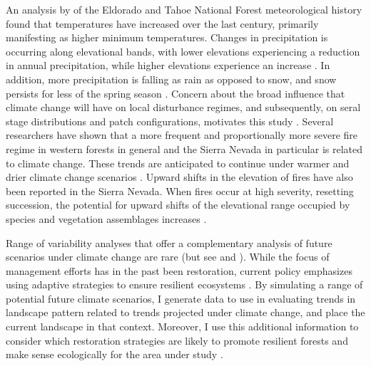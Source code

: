 An analysis by \citep{Mallek2014} of the Eldorado and Tahoe National Forest meteorological history found that temperatures have increased over the last century, primarily manifesting as higher minimum temperatures. Changes in precipitation is occurring along elevational bands, with lower elevations experiencing a reduction in annual precipitation, while higher elevations experience an increase \citep{Mallek2014}. In addition, more precipitation is falling as rain as opposed to snow, and snow persists for less of the spring season \citep{Mallek2014}. Concern about the broad influence that climate change will have on local disturbance regimes, and subsequently, on seral stage distributions and patch configurations, motivates this study \citep{Fule2008,North2012}. Several researchers have shown that a more frequent and proportionally more severe fire regime in western forests in general and the Sierra Nevada in particular \citep{McKenzie2004,Westerling2011,Miller2012} is related to climate change. These trends are anticipated to continue under warmer and drier climate change scenarios \citep{Dale2001,Cook2004,Westerling2006, Westerling2008}. Upward shifts in the elevation of fires have also been reported in the Sierra Nevada\citep{Schwartz2015}. When fires occur at high severity, resetting succession, the potential for upward shifts of the elevational range occupied by species and vegetation assemblages increases \citep{Schwartz2015}. 

Range of variability analyses that offer a complementary analysis of future scenarios under climate change are rare (but see \cite{Keane2008} and \cite{Duveneck2014}). While the focus of management efforts has in the past been restoration, current policy emphasizes using adaptive strategies to ensure resilient ecosystems \citep{Stephens2010}. By simulating a range of potential future climate scenarios, I generate data to use in evaluating trends in landscape pattern related to trends projected under climate change, and place the current landscape in that context. Moreover, I use this additional information to consider which restoration strategies are likely to promote resilient forests and make sense ecologically for the area under study \citep{Duncan2010}. 

